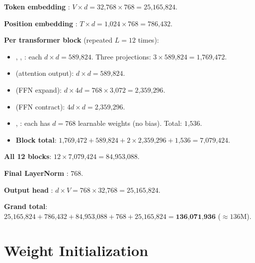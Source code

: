 \textbf{Token embedding} : $V \times d = 32\text{,}768 \times 768 = 25\text{,}165\text{,}824$.

\textbf{Position embedding} : $T \times d = 1\text{,}024 \times 768 = 786\text{,}432$.

\textbf{Per transformer block} (repeated $L = 12$ times):
\begin{itemize}
  \item {}, , : each $d \times d = 589\text{,}824$.  Three projections: $3 \times 589\text{,}824 = 1\text{,}769\text{,}472$.
  \item {} (attention output): $d \times d = 589\text{,}824$.
  \item {} (FFN expand): $d \times 4d = 768 \times 3\text{,}072 = 2\text{,}359\text{,}296$.
  \item {} (FFN contract): $4d \times d = 2\text{,}359\text{,}296$.
  \item {}, : each has $d = 768$ learnable weights (no bias).  Total: $1\text{,}536$.
  \item \textbf{Block total}: $1\text{,}769\text{,}472 + 589\text{,}824 + 2\times 2\text{,}359\text{,}296 + 1\text{,}536 = 7\text{,}079\text{,}424$.
\end{itemize}

\textbf{All 12 blocks}: $12 \times 7\text{,}079\text{,}424 = 84\text{,}953\text{,}088$.

\textbf{Final LayerNorm} : $768$.

\textbf{Output head} : $d \times V = 768 \times 32\text{,}768 = 25\text{,}165\text{,}824$.

\textbf{Grand total}: $25\text{,}165\text{,}824 + 786\text{,}432 + 84\text{,}953\text{,}088 + 768 + 25\text{,}165\text{,}824 = \mathbf{136\text{,}071\text{,}936}$ ($\approx 136$M).



\section{Weight Initialization}


